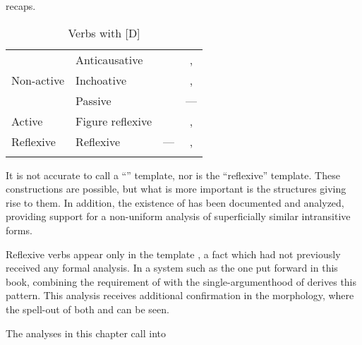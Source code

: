 \begin{exe}
\begin{xlist}
\begin{xlist}
\begin{exe}
\begin{xlist}
\begin{xlist}
\begin{exe}
\begin{xlist}
\begin{xlist}
\begin{exe}
\begin{exe}
\begin{xlist}
\begin{exe}
\begin{exe}
\begin{xlist}
\begin{exe}
\begin{exe}
\begin{exe}
\begin{exe}
\begin{exe}
\begin{xlist}
\begin{exe}
\begin{xlist}
\begin{exe}
\begin{exe}
\begin{xlist}
\begin{exe}
\begin{xlist}
\begin{exe}
\begin{xlist}
\begin{exe}
\begin{exe}
\begin{exe}
\begin{xlist}
\begin{exe}
\begin{exe}
\begin{exe}
\begin{xlist}
\begin{exe}
\begin{xlist}
\begin{exe}
\begin{exe}
\begin{xlist}
\begin{exe}
\begin{exe}
\begin{exe}
\begin{exe}
\begin{xlist}
\begin{exe}
\begin{xlist}
\begin{exe}
\begin{xlist}
\begin{exe}
\begin{xlist}
\begin{exe}
\begin{xlist}
\begin{exe}
\begin{xlist}
\begin{exe}
\begin{exe}
\begin{xlist}
\begin{exe}
\begin{xlist}
\begin{exe}
\begin{exe}
\begin{xlist}
\begin{exe}
\begin{xlist}
\begin{exe}
\begin{exe}
\begin{exe}
\begin{exe}
\begin{xlist}
\begin{xlist}
\begin{exe}
\begin{xlist}
\begin{exe}
\begin{exe}
\begin{exe}
\begin{xlist}
\begin{exe}
\begin{exe}
\begin{xlist}
\begin{exe}
\begin{exe}
\begin{exe}
\begin{xlist}
\begin{xlist}
\begin{exe}
\begin{xlist}
\begin{exe}
\begin{exe}
\begin{exe}
\begin{exe}
\begin{xlist}
\begin{exe}
\begin{xlist}
\begin{exe}
\begin{xlist}
\begin{exe}
\begin{xlist}
\begin{exe}
\begin{exe}
\begin{exe}
\begin{exe}
\begin{exe}
\begin{xlist}
\begin{exe}
\begin{xlist}
\begin{exe}
\begin{xlist}
\begin{xlist}
recaps.

\begin{table}
	\begin{tabular}{llcc} 
		\lsptoprule
		\multicolumn{2}{c}{Construction}	& {\tnif}	& {\thit} \\\midrule
		\multirow{3}{*}{Non-active} & Anticausative	& {\vz}	& {\va}, {\vz}\\
		& Inchoative & {\vz}	& {\va}, {\vz}\\
		& Passive &	{\vz}	&	---\\\tablevspace
		Active & Figure reflexive	& {\pz}	& {\va}, {\pz}\\\tablevspace
		Reflexive & Reflexive	& ---	& {\va}, {\vz}\\
		\lspbottomrule
	\end{tabular}
	\caption{Verbs with [\textminus{}D]\label{tab:1-8:tnif}}
\end{table}

It is not accurate to call {\tnif} a ``'' template, nor is {\thit} the ``reflexive'' template. These constructions are possible, but what is more important is the structures giving rise to them. In addition, the existence of  has been documented and analyzed, providing support for a non-uniform analysis of superficially similar intransitive forms.

Reflexive verbs appear only in the template {\thit}, a fact which had not previously received any formal analysis. In a system such as the one put forward in this book, combining the  requirement of {\va} with the single-argumenthood of {\vz} derives this pattern. This analysis receives additional confirmation in the morphology, where the spell-out of both {\va} and {\vz} can be seen.

The analyses in this chapter call into 
\end{xlist}
\end{xlist}
\end{exe}
\end{xlist}
\end{exe}
\end{xlist}
\end{exe}
\end{exe}
\end{exe}
\end{exe}
\end{exe}
\end{xlist}
\end{exe}
\end{xlist}
\end{exe}
\end{xlist}
\end{exe}
\end{xlist}
\end{exe}
\end{exe}
\end{exe}
\end{exe}
\end{xlist}
\end{exe}
\end{xlist}
\end{xlist}
\end{exe}
\end{exe}
\end{exe}
\end{xlist}
\end{exe}
\end{exe}
\end{xlist}
\end{exe}
\end{exe}
\end{exe}
\end{xlist}
\end{exe}
\end{xlist}
\end{xlist}
\end{exe}
\end{exe}
\end{exe}
\end{exe}
\end{xlist}
\end{exe}
\end{xlist}
\end{exe}
\end{exe}
\end{xlist}
\end{exe}
\end{xlist}
\end{exe}
\end{exe}
\end{xlist}
\end{exe}
\end{xlist}
\end{exe}
\end{xlist}
\end{exe}
\end{xlist}
\end{exe}
\end{xlist}
\end{exe}
\end{xlist}
\end{exe}
\end{exe}
\end{exe}
\end{exe}
\end{xlist}
\end{exe}
\end{exe}
\end{xlist}
\end{exe}
\end{xlist}
\end{exe}
\end{exe}
\end{exe}
\end{xlist}
\end{exe}
\end{exe}
\end{exe}
\end{xlist}
\end{exe}
\end{xlist}
\end{exe}
\end{xlist}
\end{exe}
\end{exe}
\end{xlist}
\end{exe}
\end{xlist}
\end{exe}
\end{exe}
\end{exe}
\end{exe}
\end{exe}
\end{xlist}
\end{exe}
\end{exe}
\end{xlist}
\end{exe}
\end{exe}
\end{xlist}
\end{xlist}
\end{exe}
\end{xlist}
\end{xlist}
\end{exe}
\end{xlist}
\end{xlist}
\end{exe}
